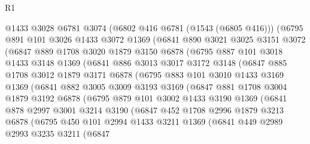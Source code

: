\begin{lexlean}{R1}
\begin{coremodule}
      @1433
      @3028
      @6781
      @3074
      (@6802 @416 @6781 (@1543 (@6805 @416)))
      (@6795
        @891
        @101
        @3026
        @1433
        @3072
        @1369
        (@6841
          @890
          @3021
          @3025
          @3151
          @3072
          (@6847
            @889
            @1708
            @3020
            @1879
            @3150
            @6878
            (@6795
              @887
              @101
              @3018
              @1433
              @3148
              @1369
              (@6841
                @886
                @3013
                @3017
                @3172
                @3148
                (@6847
                  @885
                  @1708
                  @3012
                  @1879
                  @3171
                  @6878
                  (@6795
                    @883
                    @101
                    @3010
                    @1433
                    @3169
                    @1369
                    (@6841
                      @882
                      @3005
                      @3009
                      @3193
                      @3169
                      (@6847
                        @881
                        @1708
                        @3004
                        @1879
                        @3192
                        @6878
                        (@6795
                          @879
                          @101
                          @3002
                          @1433
                          @3190
                          @1369
                          (@6841
                            @878
                            @2997
                            @3001
                            @3214
                            @3190
                            (@6847
                              @452
                              @1708
                              @2996
                              @1879
                              @3213
                              @6878
                              (@6795
                                @450
                                @101
                                @2994
                                @1433
                                @3211
                                @1369
                                (@6841
                                  @449
                                  @2989
                                  @2993
                                  @3235
                                  @3211
                                  (@6847

\end{coremodule}
\end{lexlean}
